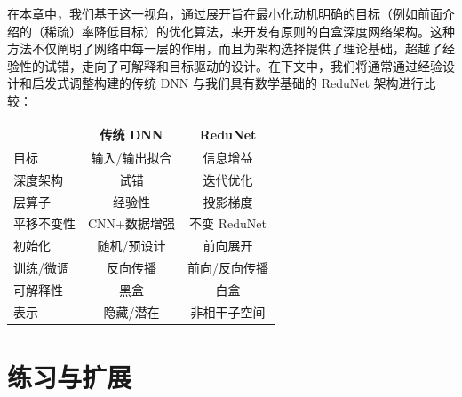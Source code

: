 \documentclass[../../book-main_zh.tex]{subfiles}
\begin{document}
在本章中，我们基于这一视角，通过展开旨在最小化动机明确的目标（例如前面介绍的（稀疏）率降低目标）的优化算法，来开发有原则的白盒深度网络架构。这种方法不仅阐明了网络中每一层的作用，而且为架构选择提供了理论基础，超越了经验性的试错，走向了可解释和目标驱动的设计。在下文中，我们将通常通过经验设计和启发式调整构建的传统 DNN 与我们具有数学基础的 ReduNet 架构进行比较：

\begin{center}
    \begin{tabular}{| l || c | c |}
        \hline
        & 传统 DNN & ReduNet\\ [0.5ex]
        \hline \hline
        目标 & 输入/输出拟合 & 信息增益\\ [0.5ex]
        \hline
        深度架构 & 试错 & 迭代优化 \\  [0.5ex]
        \hline
        层算子 & 经验性 & 投影梯度 \\  [0.5ex]
        \hline
        平移不变性 & CNN+数据增强 & 不变 ReduNet \\  [0.5ex]
        \hline
        初始化 & 随机/预设计 & 前向展开 \\ [0.5ex]
        \hline
        训练/微调 & 反向传播 & 前向/反向传播\\ [0.5ex]
        \hline
        可解释性 & 黑盒 & 白盒 \\ [0.5ex]
        \hline
        表示 & 隐藏/潜在 & 非相干子空间 \\ [0.5ex]
        \hline
    \end{tabular}
\end{center}

\section{练习与扩展}
\end{document}
